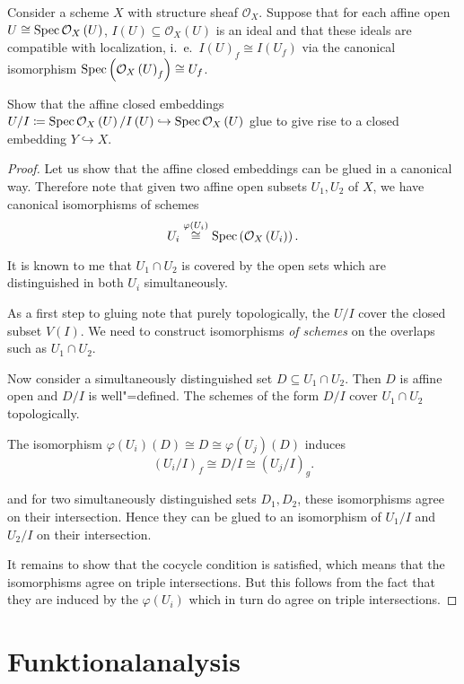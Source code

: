 \documentclass[ngerman, 11pt, a4paper, twoside, abstracton]{scrbook}
\begin{document}
\begin{exercise}
  Consider a scheme $X$ with structure sheaf $\mathcal O_X$. Suppose that for each affine open $U \cong \operatorname{Spec} \mathcal O_X\left( U \right)$, $I\left( U \right) \subseteq \mathcal O_X\left( U \right)$ is an ideal and that these ideals are compatible with localization, i.\ e.\ $I\left( U \right)_f \cong I\left( U_f \right)$ via the canonical isomorphism $\operatorname{Spec} \left(\mathcal O_X\left( U \right)_f\right) \cong U_f$.

  Show that the affine closed embeddings $U/I \coloneqq \operatorname{Spec} \mathcal O_X\left( U \right)/I\left( U \right) \hookrightarrow \operatorname{Spec}\mathcal O_X\left( U \right)$ glue to give rise to a closed embedding $Y\hookrightarrow X$.
\end{exercise}
\begin{proof}
  Let us show that the affine closed embeddings can be glued in a canonical way. Therefore note that given two affine open subsets $U_1, U_2$ of $X$, we have canonical isomorphisms of schemes
  \[
    U_i \overset{\varphi\left( U_i \right)}{\cong} \operatorname{Spec}\left( \mathcal O_X\left( U_i \right) \right).
  \]

  It is known to me that $U_1\cap U_2$ is covered by the open sets which are distinguished in both $U_i$ simultaneously.

  As a first step to gluing note that purely topologically, the $U/I$ cover the closed subset $V\left( I \right)$. We need to construct isomorphisms \textit{of schemes} on the overlaps such as $U_1 \cap U_2$.

  Now consider a simultaneously distinguished set $D \subseteq U_1\cap U_2$. Then $D$ is affine open and $D/I$ is well"=defined. The schemes of the form $D/I$ cover $U_1 \cap U_2$ topologically. 

  The isomorphism $\varphi\left( U_i \right)\left( D \right) \cong D \cong \varphi\left( U_j \right)\left( D \right)$ induces
  \[
    (U_i/I)_f \cong D/I \cong (U_j/I)_g.
  \]

  and for two simultaneously distinguished sets $D_1, D_2$, these isomorphisms agree on their intersection. Hence they can be glued to an isomorphism of $U_1/I$ and $U_2/I$ on their intersection.

  It remains to show that the cocycle condition is satisfied, which means that the isomorphisms agree on triple intersections. But this follows from the fact that they are induced by the $\varphi\left( U_i \right)$ which in turn do agree on triple intersections.
\end{proof}

\section{Funktionalanalysis}
\end{document}
